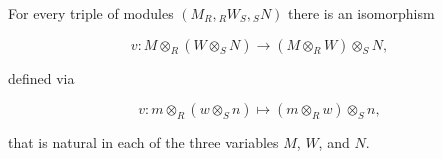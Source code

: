 For every triple of modules $(M_R, {}_R W_S, {}_S N)$ there is an isomorphism

$$v: M \otimes_R (W \otimes_S N) \to (M \otimes_R W) \otimes_S N,$$

defined via

$$v: m \otimes_R (w \otimes_S n) \mapsto (m \otimes_R w) \otimes_S n,$$

that is natural in each of the three variables $M$, $W$, and $N$.
